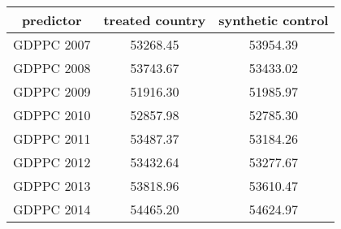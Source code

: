 \begin{tabular}{c|c|c}
predictor&\textbf{treated country}&\textbf{synthetic control}\\
\hline 
GDPPC 2007 & 53268.45 & 53954.39\\
GDPPC 2008 & 53743.67 & 53433.02\\
GDPPC 2009 & 51916.30 & 51985.97\\
GDPPC 2010 & 52857.98 & 52785.30\\
GDPPC 2011 & 53487.37 & 53184.26\\
GDPPC 2012 & 53432.64 & 53277.67\\
GDPPC 2013 & 53818.96 & 53610.47\\
GDPPC 2014 & 54465.20 & 54624.97\\
\hline
\end{tabular}